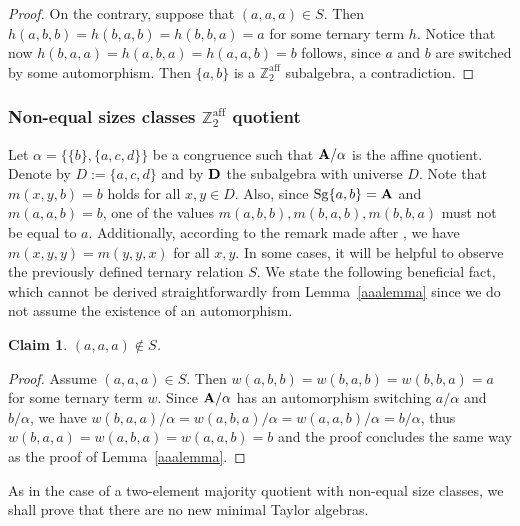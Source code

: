 \documentclass[11pt]{amsart}
\newcommand{\m}[1]{\mathbf{\uppercase{#1}}}
\theoremstyle{definition}
\theoremstyle{remark}
\theoremstyle{plain}
\newtheorem{claim}[thm]{Claim}
\begin{document}
\begin{proof}
 On the contrary, suppose that $(a,a,a)\in S$. Then $h(a,b,b)=h(b,a,b)=h(b,b,a)=a$ for some ternary term $h$. Notice that now $h(b,a,a)=h(a,b,a)=h(a,a,b)=b$ follows, since $a$ and $b$ are switched by some automorphism. Then $\{a,b\}$ is a $\mathbb{Z}^{\text{aff}}_2$ subalgebra, a contradiction.
\end{proof}


\subsubsection{Non-equal sizes classes $\mathbb{Z}^{\text{aff}}_2$ quotient}


Let $\alpha=\{\{b\},\{a,c,d\}\}$ be a congruence such that $\m a/\alpha$ is the affine quotient. Denote by $D:=\{a,c,d\}$ and by $\m d$ the subalgebra with universe $D$. Note that $m(x,y,b)=b$ holds for all $x,y\in D$. Also, since $\mathrm{Sg}\{a,b\}=\m a$ and $m(a,a,b)=b$, one of the values $m(a,b,b),m(b,a,b),m(b,b,a)$ must not be equal to $a$. Additionally, according to the remark made after , we have $m(x,y,y)=m(y,y,x)$ for all $x,y$. In some cases, it will be helpful to observe the previously defined ternary relation $S$. We state the following beneficial fact, which cannot be derived straightforwardly from Lemma~\ref{aaalemma} since we do not assume the existence of an automorphism.
\begin{claim}\label{aaaclaim}
$(a,a,a)\notin S$.
\end{claim}
\begin{proof}
Assume $(a,a,a)\in S$. Then $w(a,b,b)=w(b,a,b)=w(b,b,a)=a$ for some ternary term $w$. Since $\m a/\alpha$ has an automorphism switching $a/\alpha$ and $b/\alpha$, we have $w(b,a,a)/\alpha=w(a,b,a)/\alpha=w(a,a,b)/\alpha=b/\alpha$, thus $w(b,a,a)=w(a,b,a)=w(a,a,b)=b$ and the proof concludes the same way as the proof of Lemma~\ref{aaalemma}.
\end{proof}

As in the case of a two-element majority quotient with non-equal size classes, we shall prove that there are no new minimal Taylor algebras.
\end{document}
